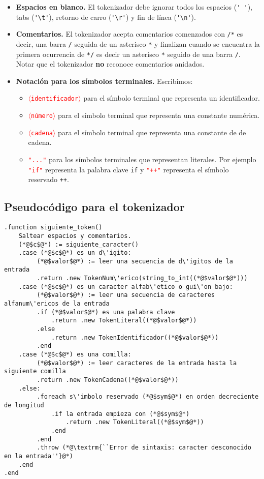 \documentclass{article}
\newcommand{\tok}[1]{\textcolor{red}{{\texttt{$\langle$#1$\rangle$}}}}
\begin{document}
\begin{itemize}
\item {\bf Espacios en blanco.}
      El tokenizador debe ignorar todos los espacios (\verb|' '|), tabs (\verb|'\t'|), retorno de carro (\verb|'\r'|) y fin de l\'inea (\verb|'\n'|).
\item {\bf Comentarios.}
      El tokenizador acepta comentarios comenzados con \verb|/*| es decir, una barra \verb|/| seguida de un asterisco \verb|*|
      y finalizan cuando se encuentra la primera ocurrencia de \verb|*/|
      es decir un asterisco \verb|*| seguido de una barra \verb|/|.
      Notar que el tokenizador {\bf no} reconoce comentarios anidados.
\item {\bf Notaci\'on para los s\'imbolos terminales.}
      Escribimos:
      \begin{itemize}
      \item \tok{identificador} para el s\'imbolo terminal que representa un identificador.
      \item \tok{n\'umero} para el s\'imbolo terminal que representa una constante num\'erica.
      \item \tok{cadena} para el s\'imbolo terminal que representa una constante de de cadena.
      \item \textcolor{red}{\texttt{"}\texttt{...}\texttt{"}} para los s\'imbolos terminales que representan literales.
      Por ejemplo \textcolor{red}{\texttt{"}\texttt{if}\texttt{"}}
      representa la palabra clave \verb|if|
      y \textcolor{red}{\texttt{"}\texttt{++}\texttt{"}} representa el s\'imbolo reservado \verb|++|.
      \end{itemize}
\end{itemize}

\subsection{Pseudoc\'odigo para el tokenizador}

\begin{lstlisting}
.function siguiente_token()
    Saltear espacios y comentarios.
    (*@$c$@*) := siguiente_caracter()
    .case (*@$c$@*) es un d\'igito:
         (*@$valor$@*) := leer una secuencia de d\'igitos de la entrada
         .return .new TokenNum\'erico(string_to_int((*@$valor$@*)))
    .case (*@$c$@*) es un caracter alfab\'etico o gui\'on bajo:
         (*@$valor$@*) := leer una secuencia de caracteres alfanum\'ericos de la entrada
         .if (*@$valor$@*) es una palabra clave
             .return .new TokenLiteral((*@$valor$@*))
         .else
             .return .new TokenIdentificador((*@$valor$@*))
         .end
    .case (*@$c$@*) es una comilla:
         (*@$valor$@*) := leer caracteres de la entrada hasta la siguiente comilla
         .return .new TokenCadena((*@$valor$@*))
    .else:
         .foreach s\'imbolo reservado (*@$sym$@*) en orden decreciente de longitud
             .if la entrada empieza con (*@$sym$@*)
                 .return .new TokenLiteral((*@$sym$@*))
             .end
         .end
         .throw (*@\textrm{``Error de sintaxis: caracter desconocido en la entrada''}@*)
    .end
.end
\end{lstlisting}
\end{document}
